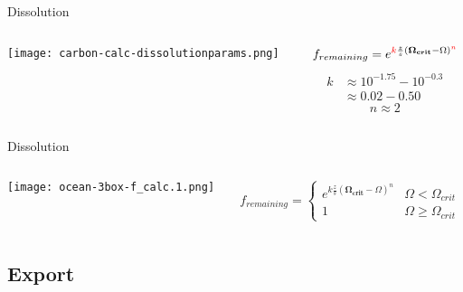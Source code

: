 \documentclass[aspectratio=169]{beamer}
\begin{document}
\begin{frame}{Dissolution}
    \begin{columns}
        \begin{column}{0.45\linewidth}
            \centering
            \texttt{[image: carbon-calc-dissolutionparams.png]}
        \end{column}
        \begin{column}{0.55\linewidth}
            $$f_{remaining} = e^{{\color{red}k} \frac{z}{s} (\mathbf{\Omega_{crit}} - \Omega)^{\color{red}n}}$$
            \begin{align*}
                k & \approx 10^{-1.75} - 10^{-0.3} \\
                & \approx 0.02 - 0.50
            \end{align*}
            $$n \approx 2$$
        \end{column}
    \end{columns}

\end{frame}

\begin{frame}{Dissolution}
    \begin{columns}
        \begin{column}{0.45\linewidth}
            \centering
            \texttt{[image: ocean-3box-f\_calc.1.png]}
        \end{column}
        \begin{column}{0.55\linewidth}
            $$f_{remaining} = \begin{cases}
                e^{k \frac{z}{s} (\mathbf{\Omega_{crit}} - \Omega)^n} & \Omega < \Omega_{crit} \\
                1 & \Omega \geq \Omega_{crit}
            \end{cases}
            $$
        \end{column}
    \end{columns}
\end{frame}

\subsection{Export}
\end{document}
